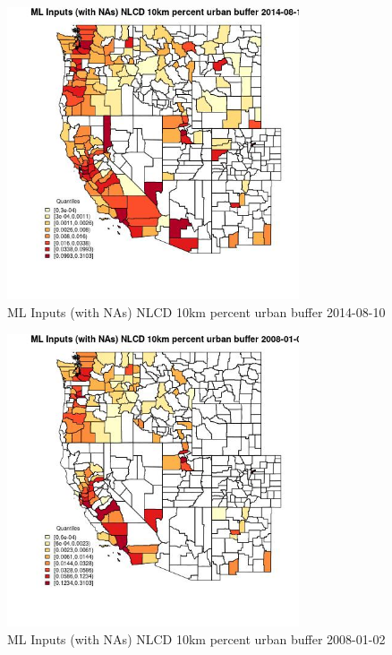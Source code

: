 \begin{figure} 
\centering  
\includegraphics[width=0.77\textwidth]{Code_Outputs/Report_ML_input_PM25_Step4_part_e_de_duplicated_aves_compiled_2019-05-18wNAs_CountyNLCD_10km_percent_urban_bufferMean2014-08-10_2014-08-10.jpg} 
\caption{\label{fig:Report_ML_input_PM25_Step4_part_e_de_duplicated_aves_compiled_2019-05-18wNAsCountyNLCD_10km_percent_urban_bufferMean2014-08-10_2014-08-10}ML Inputs (with NAs) NLCD 10km percent urban buffer 2014-08-10} 
\end{figure} 
 

\begin{figure} 
\centering  
\includegraphics[width=0.77\textwidth]{Code_Outputs/Report_ML_input_PM25_Step4_part_e_de_duplicated_aves_compiled_2019-05-18wNAs_CountyNLCD_10km_percent_urban_bufferMean2008-01-02_2008-01-02.jpg} 
\caption{\label{fig:Report_ML_input_PM25_Step4_part_e_de_duplicated_aves_compiled_2019-05-18wNAsCountyNLCD_10km_percent_urban_bufferMean2008-01-02_2008-01-02}ML Inputs (with NAs) NLCD 10km percent urban buffer 2008-01-02} 
\end{figure} 
 

